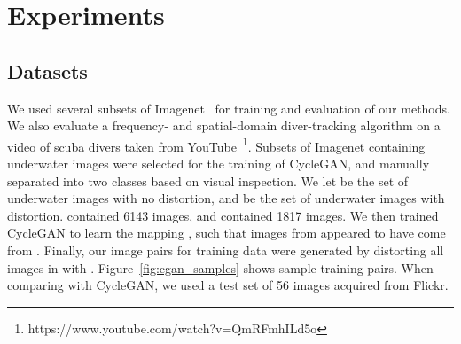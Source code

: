 \section{Experiments}
\label{sec:experiments}


\subsection{Datasets}
We used several subsets of Imagenet~\cite{deng2009imagenet} for training and evaluation of our methods. We also evaluate a 
frequency- and spatial-domain diver-tracking algorithm on a video of scuba divers taken from YouTube\texttrademark\ 
\footnote{https://www.youtube.com/watch?v=QmRFmhILd5o}. Subsets of 
Imagenet
containing underwater images were selected for the training of CycleGAN, and manually separated into two classes based on visual
inspection. We let  be the set of underwater images with no distortion, and  be the set of underwater images with 
distortion. 
contained 6143 images, and  contained 1817 images. We then trained CycleGAN to learn the mapping , such 
that images
from  appeared to have come from . Finally, our image pairs for training data were generated by distorting all images in  
with
. Figure~\ref{fig:cgan_samples} shows sample training pairs. When comparing with CycleGAN, we used a test set of 56 images 
acquired from
Flickr\texttrademark .

